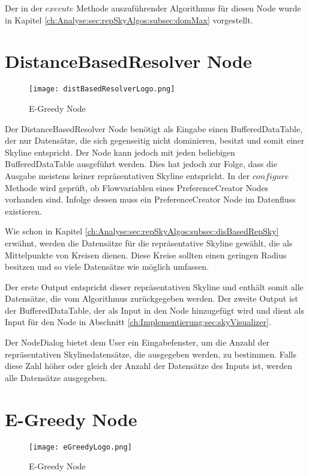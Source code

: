 Der in der $execute$ Methode auszuführender Algorithmus für diesen Node wurde in Kapitel \ref{ch:Analyse:sec:repSkyAlgos:subsec:domMax} vorgestellt. 
\section{DistanceBasedResolver Node}
\label{ch:Implementierung:sec:distBasedResolverNode}
\begin{figure}[H]
	\centering
	\texttt{[image: distBasedResolverLogo.png]}
	\caption{E-Greedy Node}
	\label{img:distBasedResolverLogo}
\end{figure}

Der DistanceBasedResolver Node benötigt als Eingabe einen BufferedDataTable, der nur Datensätze, die sich gegenseitig nicht dominieren, besitzt und somit einer Skyline entspricht. Der Node kann jedoch mit jeden beliebigen BufferedDataTable ausgeführt werden. Dies hat jedoch zur Folge, dass die Ausgabe meistens keiner repräsentativen Skyline entspricht. In der $configure$ Methode wird geprüft, ob Flowvariablen eines PreferenceCreator Nodes vorhanden sind. Infolge dessen muss ein PreferenceCreator Node im Datenfluss existieren.

Wie schon in Kapitel \ref{ch:Analyse:sec:repSkyAlgos:subsec:disBasedRepSky} erwähnt, werden die Datensätze für die repräsentative Skyline gewählt, die als Mittelpunkte von Kreisen dienen. Diese Kreise sollten einen geringen Radius besitzen und so viele Datensätze wie möglich umfassen.  

Der erste Output entspricht dieser repräsentativen Skyline und enthält somit alle Datensätze, die vom Algorithmus zurückgegeben werden. Der zweite Output ist der BufferedDataTable, der als Input in den Node hinzugefügt wird und dient als Input für den Node in Abschnitt \ref{ch:Implementierung:sec:skyVisualizer}.

Der NodeDialog bietet dem User ein Eingabefenster, um die Anzahl der repräsentativen Skylinedatensätze, die ausgegeben werden, zu bestimmen. Falls diese Zahl höher oder gleich der Anzahl der Datensätze des Inputs ist, werden alle Datensätze ausgegeben.
\section{E-Greedy Node}
\label{ch:Implementierung:sec:eGreedyNode}
\begin{figure}[H]
	\centering
	\texttt{[image: eGreedyLogo.png]}
	\caption{E-Greedy Node}
	\label{img:eGreedyLogo}
\end{figure}

